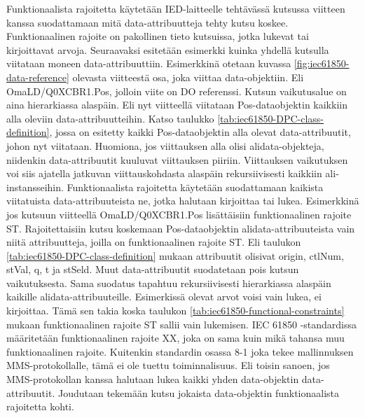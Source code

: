 Funktionaalista rajoitetta käytetään IED-laitteelle tehtävässä kutsussa viitteen kanssa suodattamaan mitä data-attribuutteja tehty kutsu koskee. Funktionaalinen rajoite on pakollinen tieto kutsuissa, jotka lukevat tai kirjoittavat arvoja. Seuraavaksi esitetään esimerkki kuinka yhdellä kutsulla viitataan moneen data-attribuuttiin. Esimerkkinä otetaan kuvassa \ref{fig:iec61850-data-reference} olevasta viitteestä osa, joka viittaa data-objektiin. Eli OmaLD/Q0XCBR1.Pos, jolloin viite on DO referenssi. Kutsun vaikutusalue on aina hierarkiassa alaspäin. Eli nyt viitteellä viitataan Pos-dataobjektin kaikkiin alla oleviin data-attribuutteihin. Katso taulukko \ref{tab:iec61850-DPC-class-definition}, jossa on esitetty kaikki Pos-dataobjektin alla olevat data-attribuutit, johon nyt viitataan. Huomiona, jos viittauksen alla olisi alidata-objekteja, niidenkin data-attribuutit kuuluvat viittauksen piiriin. Viittauksen vaikutuksen voi siis ajatella jatkuvan viittauskohdasta alaspäin rekursiivisesti kaikkiin ali-instansseihin. Funktionaalista rajoitetta käytetään suodattamaan kaikista viitatuista data-attribuuteista ne, jotka halutaan kirjoittaa tai lukea. Esimerkkinä jos kutsuun viitteellä OmaLD/Q0XCBR1.Pos lisättäisiin funktionaalinen rajoite ST. Rajoitettaisiin kutsu koskemaan Pos-dataobjektin alidata-attribuuteista vain niitä attribuutteja, joilla on funktionaalinen rajoite ST. Eli taulukon \ref{tab:iec61850-DPC-class-definition} mukaan attribuutit olisivat origin, ctlNum, stVal, q, t ja stSeld. Muut data-attribuutit suodatetaan pois kutsun vaikutuksesta. Sama suodatus tapahtuu rekursiivisesti hierarkiassa alaspäin kaikille alidata-attribuuteille. Esimerkissä olevat arvot voisi vain lukea, ei kirjoittaa. Tämä sen takia koska taulukon \ref{tab:iec61850-functional-constraints} mukaan funktionaalinen rajoite ST sallii vain lukemisen. IEC 61850 -standardissa määritetään funktionaalinen rajoite XX, joka on sama kuin mikä tahansa muu funktionaalinen rajoite. Kuitenkin standardin osassa 8-1 joka tekee mallinnuksen MMS-protokollalle, tämä ei ole tuettu toiminnalisuus. Eli toisin sanoen, jos MMS-protokollan kanssa halutaan lukea kaikki yhden data-objektin data-attribuutit. Joudutaan tekemään kutsu jokaista data-objektin funktionaalista rajoitetta kohti.

